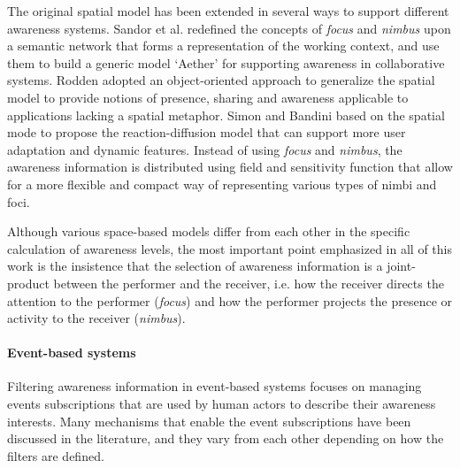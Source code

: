 The original spatial model has been extended in several ways to support different awareness systems. Sandor et al. \cite{Sandor1997} redefined the concepts of \emph{focus} and \emph{nimbus} upon a semantic network that forms a representation of the working context, and use them to build a generic model `Aether' for supporting awareness in collaborative systems. Rodden \cite{Rodden1996} adopted an object-oriented approach to generalize the spatial model to provide notions of presence, sharing and awareness applicable to applications lacking a spatial metaphor. Simon and Bandini \cite{simone2002a} based on the spatial mode to propose the reaction-diffusion model that can support more user adaptation and dynamic features. Instead of using \emph{focus} and \emph{nimbus}, the awareness information is distributed using field and sensitivity function that allow for a more flexible and compact way of representing various types of nimbi and foci. 

Although various space-based models differ from each other in the specific calculation of awareness levels, the most important point emphasized in all of this work is the insistence that the selection of awareness information is a joint-product between the performer and the receiver, i.e. how the receiver directs the attention to the performer (\emph{focus}) and how the performer projects the presence or activity to the receiver (\emph{nimbus}).

\paragraph*{Event-based systems} %
\label{par:event_based_systems}
Filtering awareness information in event-based systems focuses on managing events subscriptions that are used by human actors to describe their awareness interests. Many mechanisms that enable the event subscriptions have been discussed in the literature, and they vary from each other depending on how the filters are defined. 

